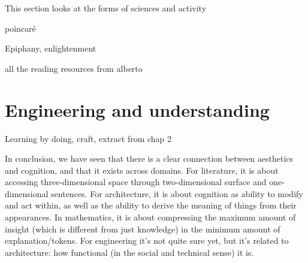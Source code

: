 This section looks at the forms of sciences and activity



poincaré

Epiphany, enlightenment

all the reading resources from alberto


\section{Engineering and understanding}
\label{sec:aesthetic-engineering}


Learning by doing, craft, extract from chap 2

\spacer

In conclusion, we have seen that there is a clear connection between aesthetics and cognition, and that it exists across domains. For literature, it is about accessing three-dimensional space through two-dimensional surface and one-dimensional sentences. For architecture, it is about cognition as ability to modify and act within, as well as the ability to derive the meaning of things from their appearances. In mathematics, it is about compressing the maximum amount of insight (which is different from just knowledge) in the minimum amount of explanation/tokens. For engineering it's not quite sure yet, but it's related to architecture: how functional (in the social and technical sense) it is.